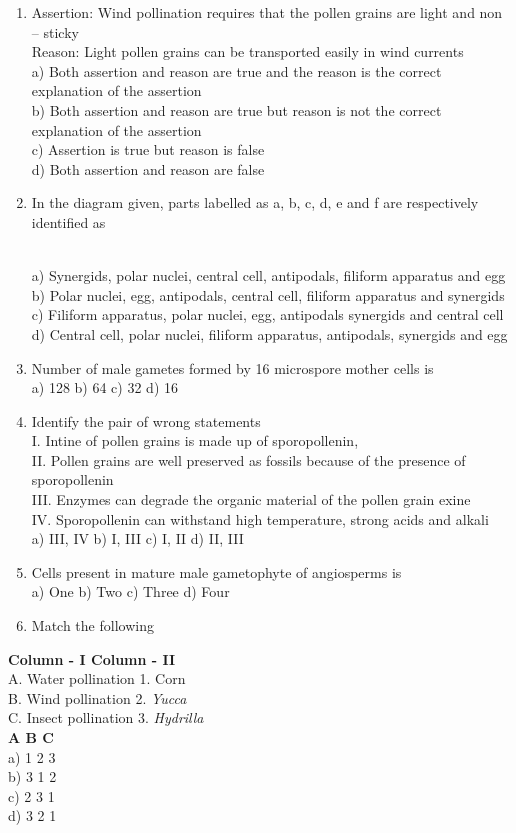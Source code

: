 \begin{enumerate}
\item
  Assertion: Wind pollination requires that the pollen grains are light
  and non -- sticky\\
  Reason: Light pollen grains can be transported easily in wind
  currents\\
  a) Both assertion and reason are true and the reason is the correct
  explanation of the assertion\\
  b) Both assertion and reason are true but reason is not the correct
  explanation of the assertion\\
  c) Assertion is true but reason is false\\
  d) Both assertion and reason are false
\item
  In the diagram given, parts labelled as a, b, c, d, e and f are
  respectively identified as\\
  \strut \\
  a) Synergids, polar nuclei, central cell, antipodals, filiform
  apparatus and egg\\
  b) Polar nuclei, egg, antipodals, central cell, filiform apparatus and
  synergids\\
  c) Filiform apparatus, polar nuclei, egg, antipodals synergids and
  central cell\\
  d) Central cell, polar nuclei, filiform apparatus, antipodals,
  synergids and egg
\item
  Number of male gametes formed by 16 microspore mother cells is\\
  a) 128 b) 64 c) 32 d) 16
\item
  Identify the pair of wrong statements\\
  I. Intine of pollen grains is made up of sporopollenin,\\
  II. Pollen grains are well preserved as fossils because of the
  presence of sporopollenin\\
  III. Enzymes can degrade the organic material of the pollen grain
  exine\\
  IV. Sporopollenin can withstand high temperature, strong acids and
  alkali\\
  a) III, IV b) I, III c) I, II d) II, III
\item
  Cells present in mature male gametophyte of angiosperms is\\
  a) One b) Two c) Three d) Four
\item
  Match the following
\end{enumerate}

\textbf{Column - I Column - II}\\
A. Water pollination 1. Corn\\
B. Wind pollination 2. \emph{Yucca}\\
C. Insect pollination 3. \emph{Hydrilla}\\
\textbf{A B C}\\
a) 1 2 3\\
b) 3 1 2\\
c) 2 3 1\\
d) 3 2 1

